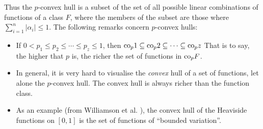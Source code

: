 Thus the $p$-convex hull is a subset of the set of all possible linear
combinations of functions of a class $F$, where the members of the
subset are those where $\sum_{i=1}^n |\alpha_i| \leq 1$.  The
following remarks concern $p$-convex hulls:
%
\begin{itemize}
\item	If $0 < p_1 \leq p_2 \leq \cdots \leq p_z \leq 1$, then
	$\mathrm{co}_p 1 \subseteq \mathrm{co}_p 2 \subseteq \cdots \subseteq \mathrm{co}_p z$
	That is to say, the higher that $p$ is, the richer the set of
	functions in $\mathrm{co}_p{F}$.
\item	In general, it is very hard to visualise the \emph{convex} hull
	of a set of functions, let alone the $p$-convex hull.  The
	convex hull is always richer than the function class.
\item	As an example (from Williamson et al. \cite{Williamson99}), the convex
	hull of the Heaviside functions on $[0, 1]$ is the set of
	functions of ``bounded variation''.
\end{itemize}





